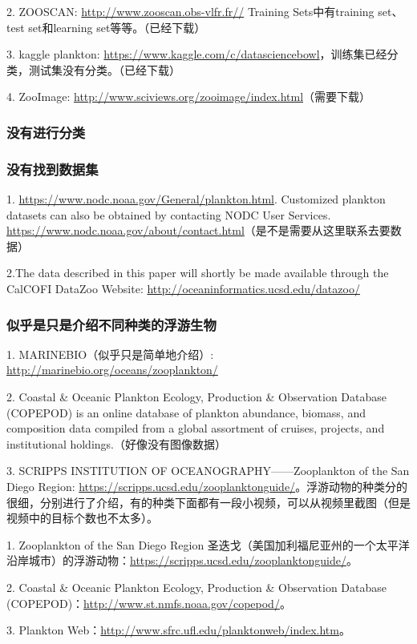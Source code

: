2. ZOOSCAN: \url{http://www.zooscan.obs-vlfr.fr//} Training Sets中有training set、test set和learning set等等。（已经下载）


3. kaggle plankton: \url{https://www.kaggle.com/c/datasciencebowl}，训练集已经分类，测试集没有分类。（已经下载）

4. ZooImage: \url{http://www.sciviews.org/zooimage/index.html}（需要下载）

\subsubsection{没有进行分类}

\subsubsection{没有找到数据集}
1. \url{https://www.nodc.noaa.gov/General/plankton.html}. Customized plankton datasets can also be obtained by contacting NODC User Services. \url{https://www.nodc.noaa.gov/about/contact.html}（是不是需要从这里联系去要数据）

2.The data described in this paper will shortly be made available through the CalCOFI DataZoo Website: \url{http://oceaninformatics.ucsd.edu/datazoo/}


\subsubsection{似乎是只是介绍不同种类的浮游生物}
1. MARINEBIO（似乎只是简单地介绍）: \url{http://marinebio.org/oceans/zooplankton/}

2. Coastal \& Oceanic Plankton Ecology, Production \& Observation Database (COPEPOD) is an online database of plankton abundance, biomass, and composition data compiled from a global assortment of cruises, projects, and institutional holdings.（好像没有图像数据）

3. SCRIPPS INSTITUTION OF OCEANOGRAPHY——Zooplankton of the San Diego Region: \url{https://scripps.ucsd.edu/zooplanktonguide/}。浮游动物的种类分的很细，分别进行了介绍，有的种类下面都有一段小视频，可以从视频里截图（但是视频中的目标个数也不太多）。

{\color{red}1. Zooplankton of the San Diego Region 圣迭戈（美国加利福尼亚州的一个太平洋沿岸城市）的浮游动物：\url{https://scripps.ucsd.edu/zooplanktonguide/}。

2. Coastal \& Oceanic Plankton Ecology, Production \& Observation Database (COPEPOD)：\url{http://www.st.nmfs.noaa.gov/copepod/}。

3. Plankton Web：\url{http://www.sfrc.ufl.edu/planktonweb/index.htm}。
}



















